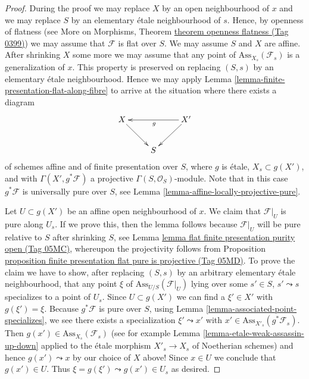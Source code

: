\documentclass{amsart}
\theoremstyle{plain}
\theoremstyle{definition}
\theoremstyle{remark}
\numberwithin{equation}{subsection}
\begin{document}
\begin{proof}
During the proof we may replace $X$ by an open neighbourhood of $x$
and we may replace $S$ by an elementary \'etale neighbourhood of $s$.
Hence, by openness of flatness (see
More on Morphisms, Theorem \href{https://stacks.math.columbia.edu/tag/0399}{theorem openness flatness (Tag 0399)})
we may assume that $\mathcal{F}$ is flat over $S$.
We may assume $S$ and $X$ are affine.
After shrinking $X$ some more we may assume that any
point of $\text{Ass}_{X_s}(\mathcal{F}_s)$ is a generalization of $x$.
This property is preserved on replacing $(S, s)$ by an elementary
\'etale neighbourhood. Hence we may apply
Lemma \ref{lemma-finite-presentation-flat-along-fibre}
to arrive at the situation where there exists a diagram
$$
\xymatrix{
X \ar[dr] & & X' \ar[ll]^g \ar[ld] \\
& S &
}
$$
of schemes affine and of finite presentation over $S$,
where $g$ is \'etale, $X_s \subset g(X')$, and with
$\Gamma(X', g^*\mathcal{F})$ a projective $\Gamma(S, \mathcal{O}_S)$-module.
Note that in this case $g^*\mathcal{F}$ is universally pure over $S$, see
Lemma \ref{lemma-affine-locally-projective-pure}.

\medskip\noindent
Let $U \subset g(X')$ be an affine open neighbourhood of $x$.
We claim that $\mathcal{F}|_U$ is pure along $U_s$. If we prove this, then
the lemma follows because $\mathcal{F}|_U$ will be pure relative to $S$
after shrinking $S$, see
Lemma \href{https://stacks.math.columbia.edu/tag/05MC}{lemma flat finite presentation purity open (Tag 05MC)},
whereupon the projectivity follows from
Proposition \href{https://stacks.math.columbia.edu/tag/05MD}{proposition finite presentation flat pure is projective (Tag 05MD)}.
To prove the claim we have to show, after replacing $(S, s)$
by an arbitrary elementary \'etale neighbourhood, that any point $\xi$ of
$\text{Ass}_{U/S}(\mathcal{F}|_U)$ lying over some
$s' \in S$, $s' \leadsto s$ specializes to a point of $U_s$.
Since $U \subset g(X')$ we can find a $\xi' \in X'$ with
$g(\xi') = \xi$. Because $g^*\mathcal{F}$ is pure over $S$, using
Lemma \ref{lemma-associated-point-specializes},
we see there exists a specialization $\xi' \leadsto x'$ with
$x' \in \text{Ass}_{X'_s}(g^*\mathcal{F}_s)$. Then
$g(x') \in \text{Ass}_{X_s}(\mathcal{F}_s)$ (see for example
Lemma \ref{lemma-etale-weak-assassin-up-down}
applied to the \'etale morphism $X'_s \to X_s$ of Noetherian schemes)
and hence $g(x') \leadsto x$ by our choice of $X$ above! Since
$x \in U$ we conclude that $g(x') \in U$. Thus
$\xi = g(\xi') \leadsto g(x') \in U_s$ as desired.
\end{proof}
\end{document}
